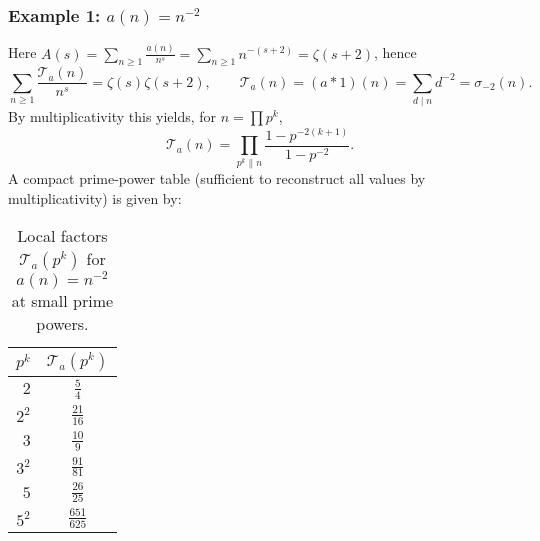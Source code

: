 \documentclass[11pt,a4paper]{amsart}
\theoremstyle{plain}
\theoremstyle{definition}
\theoremstyle{remark}
\begin{document}
\subsubsection*{Example 1: $a(n)=n^{-2}$}
Here $A(s)=\sum_{n\ge1}\frac{a(n)}{n^{s}}=\sum_{n\ge1}n^{-(s+2)}=\zeta(s+2)$, hence
\[
\sum_{n\ge1}\frac{\mathcal{T}_a(n)}{n^{s}}=\zeta(s)\zeta(s+2),\qquad
\mathcal{T}_a(n)=(a*1)(n)=\sum_{d\mid n} d^{-2}=\sigma_{-2}(n).
\]
By multiplicativity this yields, for $n=\prod p^{k}$,
\[
\mathcal{T}_a(n)
=\prod_{p^k\parallel n}\frac{1-p^{-2(k+1)}}{1-p^{-2}}.
\]
A compact prime-power table (sufficient to reconstruct all values by multiplicativity) is given by:
\begin{table}[h]
\centering
\caption{Local factors $\mathcal{T}_a(p^k)$ for $a(n)=n^{-2}$ at small prime powers.}
\begin{tabular}{r c}
\toprule
$p^k$ & $\mathcal{T}_a(p^k)$\\
\midrule
$2$   & \(\frac{5}{4}\) \\
$2^2$ & \(\frac{21}{16}\) \\
$3$   & \(\frac{10}{9}\) \\
$3^2$ & \(\frac{91}{81}\) \\
$5$   & \(\frac{26}{25}\) \\
$5^2$ & \(\frac{651}{625}\) \\
\bottomrule
\end{tabular}
\end{table}
\end{document}
